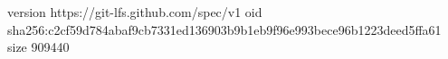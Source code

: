 version https://git-lfs.github.com/spec/v1
oid sha256:c2cf59d784abaf9cb7331ed136903b9b1eb9f96e993bece96b1223deed5ffa61
size 909440
